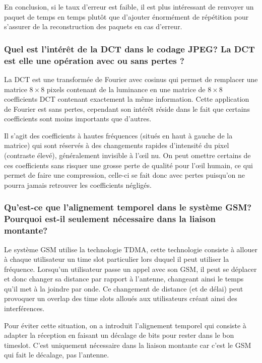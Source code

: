 En conclusion, si le taux d'erreur est faible, il est plus intéressant de renvoyer un paquet de temps en temps plutôt que d'ajouter énormément de répétition pour s'assurer de la reconstruction des paquets en cas d'erreur.

\subsubsection{Quel est l'intérêt de la DCT dans le codage JPEG? La DCT est elle une
opération avec ou sans pertes ?}

La DCT est une transformée de Fourier avec cosinus qui permet de remplacer une matrice $8\times 8$ pixels contenant de la luminance en une matrice de $8\times 8$ coefficients DCT contenant exactement la même information. Cette application de Fourier est sans pertes, cependant son intérêt réside dans le fait que certains coefficients sont moins importants que d'autres.

Il s'agit des coefficients à hautes fréquences (situés en haut à gauche de la matrice) qui sont réservés à des changements rapides d'intensité du pixel (contraste élevé), généralement invisible à l'\oe il nu. On peut omettre certains de ces coefficients sans risquer une grosse perte de qualité pour l'\oe il humain, ce qui permet de faire une compression, celle-ci se fait donc avec pertes puisqu'on ne pourra jamais retrouver les coefficients négligés.

\subsubsection{Qu'est-ce que l'alignement temporel dans le système GSM? Pourquoi
est-il seulement nécessaire dans la liaison montante?}

Le système GSM utilise la technologie TDMA, cette technologie consiste à allouer à chaque utilisateur un time slot particulier lors duquel il peut utiliser la fréquence. Lorsqu'un utilisateur passe un appel avec son GSM, il peut se déplacer et donc changer sa distance par rapport à l'antenne, changeant ainsi le temps qu'il met à la joindre par onde. Ce changement de distance (et de délai) peut provoquer un overlap des time slots alloués aux utilisateurs créant ainsi des interférences.

Pour éviter cette situation, on a introduit l'alignement temporel qui consiste à adapter la réception en faisant un décalage de bits pour rester dans le bon timeslot. C'est uniquement nécessaire dans la liaison montante car c'est le GSM qui fait le décalage, pas l'antenne.

